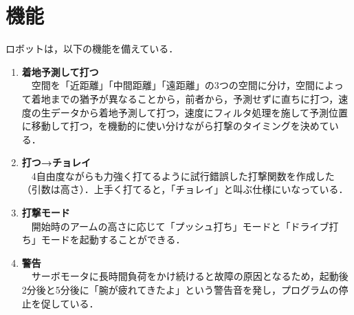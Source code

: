\documentclass[11pt, oneside, titlepage]{jarticle}
\begin{document}
\section{機能}
ロボットは，以下の機能を備えている．
\begin{enumerate}
\item {\bf 着地予測して打つ} \\
　空間を「近距離」「中間距離」「遠距離」の3つの空間に分け，空間によって着地までの猶予が異なることから，前者から，予測せずに直ちに打つ，速度の生データから着地予測して打つ，速度にフィルタ処理を施して予測位置に移動して打つ，を機動的に使い分けながら打撃のタイミングを決めている．
\item {\bf 打つ→チョレイ} \\
　4自由度ながらも力強く打てるように試行錯誤した打撃関数を作成した（引数は高さ）．上手く打てると，「チョレイ」と叫ぶ仕様にいなっている．
\item {\bf 打撃モード} \\
　開始時のアームの高さに応じて「プッシュ打ち」モードと「ドライブ打ち」モードを起動することができる．
\item {\bf 警告} \\
　サーボモータに長時間負荷をかけ続けると故障の原因となるため，起動後2分後と5分後に「腕が疲れてきたよ」という警告音を発し，プログラムの停止を促している．
\end{enumerate}
\end{document}
